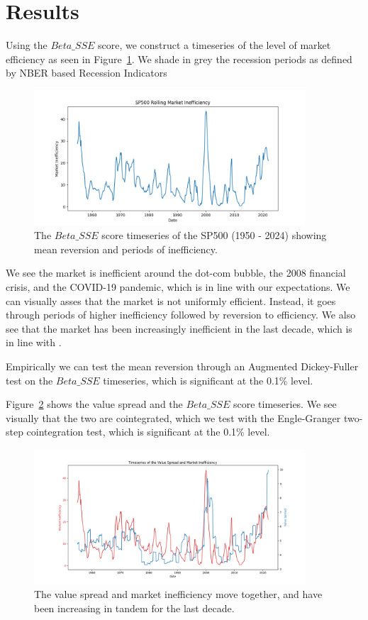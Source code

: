 \section{Results}
\label{sec:results}

Using the $Beta\_SSE$ score, we construct a timeseries of the level of market efficiency as seen in Figure~\ref{fig:sp_500_SSE_beta_ts}.
We shade in grey the recession periods as defined by NBER based Recession Indicators \citep{usrec}
\begin{figure}[h!]
    \centering
    \includegraphics[width=0.9\textwidth]{../figs/SP500 Rolling Market Inefficiency.png}
    \caption{The $Beta\_SSE$ score timeseries of the SP500 (1950 - 2024) showing mean reversion and periods of inefficiency.}
    \label{fig:sp_500_SSE_beta_ts}
\end{figure}

We see the market is inefficient around the dot-com bubble, the 2008 financial crisis, and the COVID-19 pandemic, which is in line with our expectations.
We can visually asses that the market is not uniformly efficient. Instead, it goes through periods of higher inefficiency followed by reversion to efficiency.
We also see that the market has been increasingly inefficient in the last decade, which is in line with \citet{asness_2024}.

Empirically we can test the mean reversion through an Augmented Dickey-Fuller test \citep{cheung1995lag} on the $Beta\_SSE$ timeseries, which is significant at the 0.1\% level.

Figure~\ref{value_spread_beta_sse} shows the value spread and the $Beta\_SSE$ score timeseries. We see visually that the two are cointegrated, which we test with
the Engle-Granger two-step cointegration test, which is significant at the 0.1\% level.

\begin{figure}[h!]
    \centering
    \includegraphics[width=0.9\textwidth]{../figs/Value Spread and Market Inefficiency.png}
    \caption{The value spread and market inefficiency move together, and have been increasing in tandem for the last decade.}
    \label{value_spread_beta_sse}
\end{figure}
